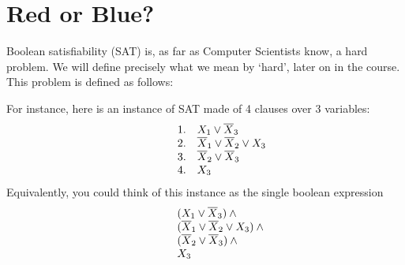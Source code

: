 \section{Red or Blue?}

Boolean satisfiability (SAT)  is, as far as  Computer Scientists know, a  hard problem. We
will define precisely what we mean by `hard', later on in the course. This problem is defined
as follows:
\begin{center}
\end{center}
For instance, here is an instance of SAT made of 4 clauses over 3 variables:
\begin{displaymath}
	\begin{array}{rrl}
		\hbox to 20pt{\hfil} & 1. & X_1 \lor \overline{X}_3                     \\
		                     & 2. & \overline{X}_1 \lor \overline{X}_2 \lor X_3 \\
		                     & 3. & \overline{X}_2 \lor \overline{X}_3          \\
		                     & 4. & X_3                                         \\
	\end{array}
\end{displaymath}
Equivalently, you could think of this instance as the single boolean expression
\begin{displaymath}
	\begin{array}{rl}
		\hbox to 20pt{\hfil} & (X_1 \lor \overline{X}_3) \land {}                     \\
		                     & (\overline{X}_1 \lor \overline{X}_2 \lor X_3) \land {} \\
		                     & (\overline{X}_2 \lor \overline{X}_3) \land {}          \\
		                     & X_3                                                    \\
	\end{array}
\end{displaymath}

